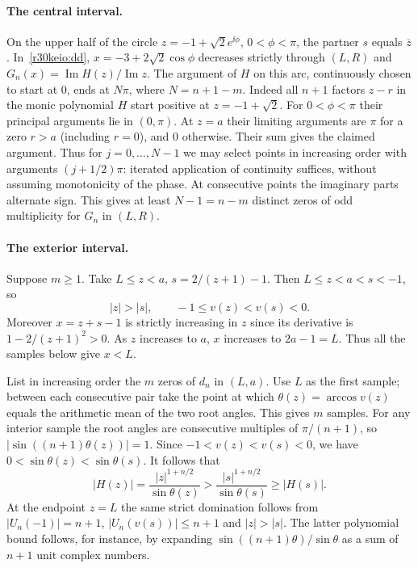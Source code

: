 \documentclass[11pt,a4paper]{article}
\numberwithin{equation}{section}
\theoremstyle{definition}
\theoremstyle{remark}
\begin{document}
\paragraph{The central interval.}
On the upper half of the circle $z=-1+\sqrt2 e^{\ii\phi}$, $0<\phi<\pi$, the partner $s$ equals $\overline z$. In~\eqref{r30keio:dd}, $x=-3+2\sqrt2\cos\phi$ decreases strictly through $(L,R)$ and $G_n(x)=\operatorname{Im}H(z)/\operatorname{Im}z$. The argument of $H$ on this arc, continuously chosen to start at $0$, ends at $N\pi$, where $N=n+1-m$. Indeed all $n+1$ factors $z-r$ in the monic polynomial $H$ start positive at $z=-1+\sqrt2$. For $0<\phi<\pi$ their principal arguments lie in $(0,\pi)$. At $z=a$ their limiting arguments are $\pi$ for a zero $r>a$ (including $r=0$), and $0$ otherwise. Their sum gives the claimed argument. Thus for $j=0,\ldots,N-1$ we may select points in increasing order with arguments $(j+1/2)\pi$: iterated application of continuity suffices, without assuming monotonicity of the phase. At consecutive points the imaginary parts alternate sign. This gives at least $N-1=n-m$ distinct zeros of odd multiplicity for $G_n$ in $(L,R)$.

\paragraph{The exterior interval.}
Suppose $m\ge1$. Take $L\le z<a$, $s=2/(z+1)-1$. Then $L\le z<a<s<-1$, so
\[
 |z|>|s|,\qquad -1\le v(z)<v(s)<0.
\]
Moreover $x=z+s-1$ is strictly increasing in $z$ since its derivative is $1-2/(z+1)^2>0$. As $z$ increases to $a$, $x$ increases to $2a-1=L$. Thus all the samples below give $x<L$.

List in increasing order the $m$ zeros of $d_n$ in $(L,a)$. Use $L$ as the first sample; between each consecutive pair take the point at which $\theta(z)=\arccos v(z)$ equals the arithmetic mean of the two root angles. This gives $m$ samples. For any interior sample the root angles are consecutive multiples of $\pi/(n+1)$, so $|\sin((n+1)\theta(z))|=1$. Since $-1<v(z)<v(s)<0$, we have
$0<\sin\theta(z)<\sin\theta(s)$. It follows that
\begin{equation}
 |H(z)|=\frac{|z|^{1+n/2}}{\sin\theta(z)}
       >\frac{|s|^{1+n/2}}{\sin\theta(s)}\ge |H(s)|.\label{r30keio:key}
\end{equation}
At the endpoint $z=L$ the same strict domination follows from $|U_n(-1)|=n+1$, $|U_n(v(s))|\le n+1$ and $|z|>|s|$. The latter polynomial bound follows, for instance, by expanding $\sin((n+1)\theta)/\sin\theta$ as a sum of $n+1$ unit complex numbers.
\end{document}
